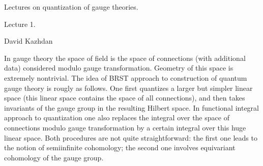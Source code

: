 \def\grA{{\gr A}}	\def\gra{{\gr a}}
\def\grB{{\gr B}}	\def\grb{{\gr b}}
\def\grC{{\gr C}}	\def\grc{{\gr c}}
\def\grD{{\gr D}}	\def\grd{{\gr d}}
\def\grE{{\gr E}}	\def\gre{{\gr e}}
\def\grF{{\gr F}}	\def\grf{{\gr f}}
\def\grG{{\gr G}}	\def\grg{{\gr g}}
\def\grH{{\gr H}}	\def\grh{{\gr h}}
\def\grI{{\gr I}}	\def\gri{{\gr i}}
\def\grJ{{\gr J}}	\def\grj{{\gr j}}
\def\grK{{\gr K}}	\def\grk{{\gr k}}
\def\grL{{\gr L}}	\def\grl{{\gr l}}
\def\grM{{\gr M}}	\def\grm{{\gr m}}
\def\grN{{\gr N}}	\def\grn{{\gr n}}
\def\grO{{\gr O}}	\def\gro{{\gr o}}
\def\grP{{\gr P}}	\def\grp{{\gr p}}
\def\grQ{{\gr Q}}	\def\grq{{\gr q}}
\def\grR{{\gr R}}	\def\grr{{\gr r}}
\def\grS{{\gr S}}	\def\grs{{\gr s}}
\def\grT{{\gr T}}	\def\grt{{\gr t}}
\def\grU{{\gr U}}	\def\gru{{\gr u}}
\def\grV{{\gr V}}	\def\grv{{\gr v}}
\def\grW{{\gr W}}	\def\grw{{\gr w}}
\def\grX{{\gr X}}	\def\grx{{\gr x}}
\def\grY{{\gr Y}}	\def\gry{{\gr y}}
\def\grZ{{\gr Z}}	\def\grz{{\gr z}}

\def\g{\grg}
\def\scr#1{{\fam\eusmfam\relax#1}}

\def\scrA{{\scr A}}   \def\scrB{{\scr B}}
\def\scrC{{\scr C}}   \def\scrD{{\scr D}}
\def\scrE{{\scr E}}   \def\scrF{{\scr F}}
\def\scrG{{\scr G}}   \def\scrH{{\scr H}}
\def\scrI{{\scr I}}   \def\scrJ{{\scr J}}
\def\scrK{{\scr K}}   \def\scrL{{\scr L}}
\def\scrM{{\scr M}}   \def\scrN{{\scr N}}
\def\scrO{{\scr O}}   \def\scrP{{\scr P}}
\def\scrQ{{\scr Q}}   \def\scrR{{\scr R}}
\def\scrS{{\scr S}}   \def\scrT{{\scr T}}
\def\scrU{{\scr U}}   \def\scrV{{\scr V}}
\def\scrW{{\scr W}}   \def\scrX{{\scr X}}
\def\scrY{{\scr Y}}   \def\scrZ{{\scr Z}}
\def\hatP{{\widehat{P}}}
\def\hatQ{{\widehat{Q}}}
\def\Qhat{{\widehat{Q}}}
\def\ten{\otimes}
\def\hatd{{\hat{d}}}

\def\scrTbar{{\overline{\scr T}}}
\def\scrGbar{{\overline{\scr G}}}
\def\Vbar{{\overline{V}}}

\def\iso{\widetilde{\to}}

\def\sf{\bf}
\def\ksi{\xi}

\NoBlackBoxes
\document


\centerline{\boldtitlefont Lectures on quantization of gauge theories.}

\medskip
\centerline{\bigboldtitlefont Lecture 1.}

\bigskip
\centerline{David Kazhdan}

In gauge theory the space of field is the space of connections (with
additional data) considered modulo gauge transformation. Geometry of this
space is extremely nontrivial. The idea of BRST approach to construction of
quantum gauge theory is rougly as follows.
One first  quantizes a larger but simpler linear space (this linear space
contains the  space of all connections),
and then takes invariants of the gauge group in the resulting Hilbert space.
In functional integral approach to quantization one also replaces 
the integral over the space of connections  modulo gauge transformation
by a certain integral over this huge linear space.
 Both procedures are not quite
straightforward: the first one leads to the notion of semiinfinite
cohomology; the second one involves equivariant cohomology of the 
gauge group. 

